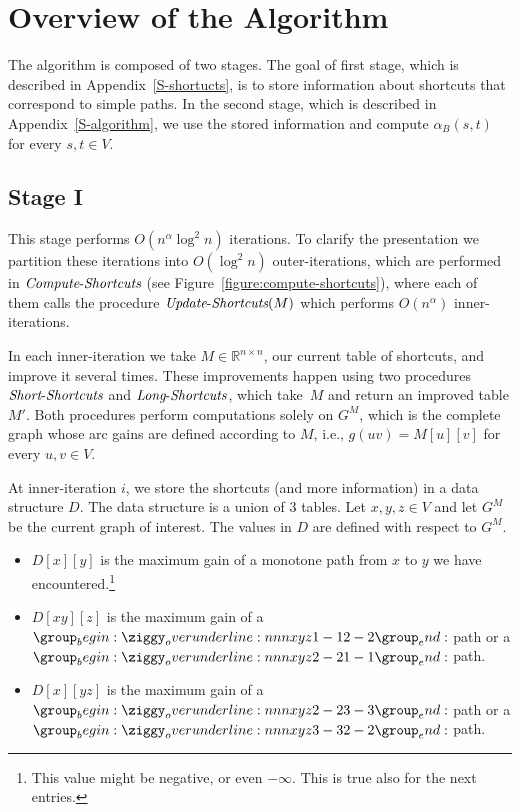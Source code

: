 \documentclass[11pt]{article}
\newcommand{\RR}{\mathbb{R}}
\newcommand{\LS}{\mbox{{\it Long}-{\it Shortcuts}}}
\newcommand{\Simple}{\mbox{{\it Short}-{\it Shortcuts}}}
\newcommand{\ComputeS}{\mbox{{\it Compute}-{\it Shortcuts}}}
\newcommand{\UpdateS}{\mbox{{\it Update}-{\it Shortcuts}}}
\begin{document}
\section{Overview of the Algorithm}\label{S-overview}
The algorithm is composed of two stages. The goal of first stage, which is described in Appendix~\ref{S-shortucts}, is to store information about shortcuts that correspond to simple paths. In the second stage, which is described in Appendix~\ref{S-algorithm}, we use the stored information and compute $\alpha_B(s,t)$ for every $s,t\in V$.


\subsection{Stage I}
This stage performs $O\left(n^\alpha\log^2 n\right)$ iterations.
To clarify the presentation we partition these iterations into 
$O\left(\log^2 n\right)$ outer-iterations, which are performed in $\ComputeS$ (see Figure~\ref{figure:compute-shortcuts}), where each of them calls the procedure $\UpdateS(M)$ which performs 
$O(n^\alpha)$
inner-iterations.

In each inner-iteration we take $M\in \RR^{n\times n}$, our current table of shortcuts, and improve it several times. These improvements happen using two procedures $\Simple$ and $\LS$, which take~$M$ and return an improved table $M'$. Both procedures perform computations solely on $G^M$, which is the complete graph whose arc gains are defined according to $M$, i.e., $g(uv)=M[u][v]$ for every $u,v\in V$.

At inner-iteration $i$, we store the shortcuts (and more information) in a data structure $D$. The data structure is a union of $3$ tables. Let $x,y,z\in V$ and let $G^M$ be the current graph of interest. The values in $D$ are defined with respect to $G^M$.

\begin{itemize}
    \item $D[x][y]$ is the maximum gain of a monotone path from $x$ to $y$ we have encountered.\footnote{This value might be negative, or even $-\infty$. This is true also for the next entries.}
    \item $D[xy][z]$ is the maximum gain of a $\overunderline{xyz}{1-1}{2-2}$ path or a $\overunderline{xyz}{2-2}{1-1}$ path. 
    \item $D[x][yz]$ is the maximum gain of a $\overunderline{xyz}{2-2}{3-3}$ path or a $\overunderline{xyz}{3-3}{2-2}$ path.
\end{itemize}
\end{document}
